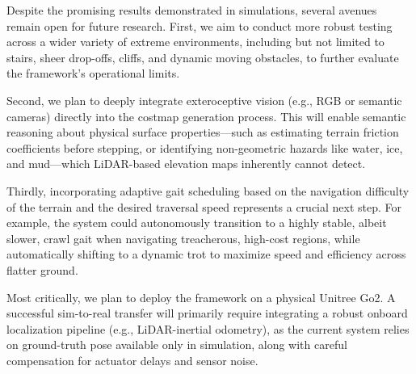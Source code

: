 \documentclass[letterpaper, 10 pt, conference]{ieeeconf}  %
\begin{document}
Despite the promising results demonstrated in simulations, several avenues remain open for future research. First, we aim to conduct more robust testing across a wider variety of extreme environments, including but not limited to stairs, sheer drop-offs, cliffs, and dynamic moving obstacles, to further evaluate the framework's operational limits. 

Second, we plan to deeply integrate exteroceptive vision (e.g., RGB or semantic cameras) directly into the costmap generation process. This will enable semantic reasoning about physical surface properties—such as estimating terrain friction coefficients before stepping, or identifying non-geometric hazards like water, ice, and mud—which LiDAR-based elevation maps inherently cannot detect.

Thirdly, incorporating adaptive gait scheduling based on the navigation difficulty of the terrain and the desired traversal speed represents a crucial next step. For example, the system could autonomously transition to a highly stable, albeit slower, crawl gait when navigating treacherous, high-cost regions, while automatically shifting to a dynamic trot to maximize speed and efficiency across flatter ground. 

Most critically, we plan to deploy the framework on a physical Unitree Go2. A successful sim-to-real transfer will primarily require integrating a robust onboard localization pipeline (e.g., LiDAR-inertial odometry), as the current system relies on ground-truth pose available only in simulation, along with careful compensation for actuator delays and sensor noise.




\end{document}
